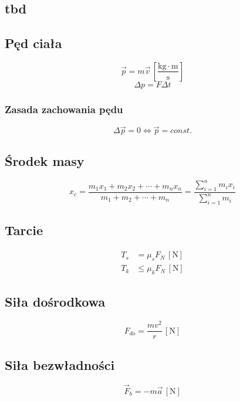 \documentclass{article}
\numberwithin{equation}{section}
\newcommand{\unit}[1]{\, \left[\mathrm{#1}\right]}
\begin{document}
    \subsection{tbd}
    \subsection{Pęd ciała}
      \begin{equation}
        \vec p = m\vec v \unit{\frac{kg\cdot m}{s}}
      \end{equation}
      \begin{equation}
        \Delta p = F\Delta t
      \end{equation}
      \subsubsection{Zasada zachowania pędu}
        \begin{equation}
          \Delta \vec p = 0 \Leftrightarrow \vec p = const.
        \end{equation}
      \subsection{Środek masy}
        \begin{equation}
          x_c = \frac{m_1x_1+m_2x_2+\cdots+m_nx_n}{m_1+m_2+\cdots+m_n} =
          \frac{\sum\limits_{i=1}^n m_ix_i}{\sum\limits_{i=1}^n m_i}
        \end{equation}
      \subsection{Tarcie}
        \begin{align}
          T_s &= \mu_sF_N \unit{N}\\
          T_k &\leqslant \mu_kF_N \unit{N}
        \end{align}
      \subsection{Siła dośrodkowa}
        \begin{equation}
          F_{do} = \frac{mv^2}{r} \unit{N}
        \end{equation}
        \subsection{Siła bezwładności}
        \begin{equation}
          \vec F_b = -m\vec a \unit{N}
        \end{equation}
\end{document}
